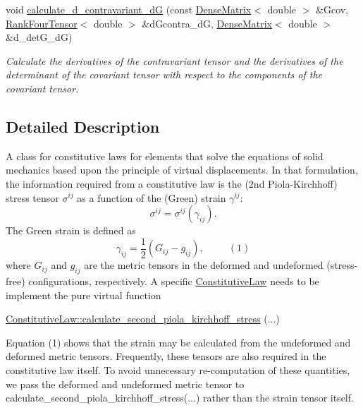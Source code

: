 \begin{DoxyCompactItemize}
void \hyperlink{classoomph_1_1ConstitutiveLaw_a6dda64e60ed8128cb4603041dc66036f}{calculate\+\_\+d\+\_\+contravariant\+\_\+dG} (const \hyperlink{classoomph_1_1DenseMatrix}{Dense\+Matrix}$<$ double $>$ \&Gcov, \hyperlink{classoomph_1_1RankFourTensor}{Rank\+Four\+Tensor}$<$ double $>$ \&d\+Gcontra\+\_\+dG, \hyperlink{classoomph_1_1DenseMatrix}{Dense\+Matrix}$<$ double $>$ \&d\+\_\+det\+G\+\_\+dG)
\begin{DoxyCompactList}\small\item\em Calculate the derivatives of the contravariant tensor and the derivatives of the determinant of the covariant tensor with respect to the components of the covariant tensor. \end{DoxyCompactList}\end{DoxyCompactItemize}


\subsection{Detailed Description}
A class for constitutive laws for elements that solve the equations of solid mechanics based upon the principle of virtual displacements. In that formulation, the information required from a constitutive law is the (2nd Piola-\/\+Kirchhoff) stress tensor $ \sigma^{ij} $ as a function of the (Green) strain $ \gamma^{ij} $\+: \[ \sigma^{ij} = \sigma^{ij}(\gamma_{ij}). \] The Green strain is defined as \[ \gamma_{ij} = \frac{1}{2} (G_{ij} - g_{ij}), \ \ \ \ \ \ \ \ \ \ \ (1) \] where $G_{ij} $ and $ g_{ij}$ are the metric tensors in the deformed and undeformed (stress-\/free) configurations, respectively. A specific \hyperlink{classoomph_1_1ConstitutiveLaw}{Constitutive\+Law} needs to be implement the pure virtual function 
\begin{DoxyCode}
\hyperlink{classoomph_1_1ConstitutiveLaw_a93527d910de908035feb8f41b0401065}{ConstitutiveLaw::calculate\_second\_piola\_kirchhoff\_stress}
      (...)
\end{DoxyCode}
 Equation (1) shows that the strain may be calculated from the undeformed and deformed metric tensors. Frequently, these tensors are also required in the constitutive law itself. To avoid unnecessary re-\/computation of these quantities, we pass the deformed and undeformed metric tensor to {\ttfamily calculate\+\_\+second\+\_\+piola\+\_\+kirchhoff\+\_\+stress}(...) rather than the strain tensor itself.

